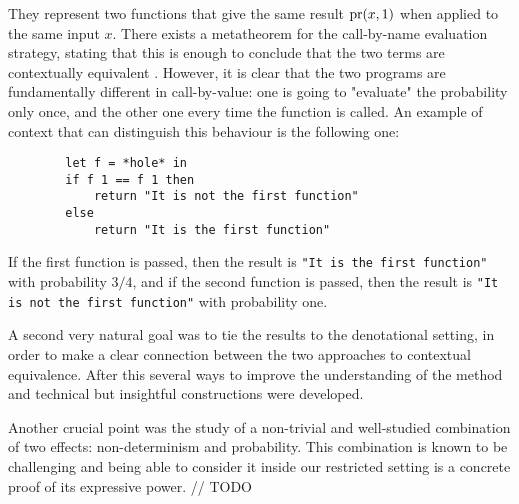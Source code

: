 They represent 
two functions that give the same result $\operatorname{pr} (x, 1)$ when 
applied to the same input $x$. There exists a metatheorem 
for the call-by-name evaluation strategy, stating that this is 
enough to conclude that the two terms are contextually equivalent
\cite{gom}. However, it is clear that the two programs are fundamentally 
different in call-by-value: one is going to "evaluate" the probability 
only once, and the other one every time the function is called. An example 
of context that can distinguish this behaviour is the following one:

\begin{verbatim}
        let f = *hole* in
        if f 1 == f 1 then 
            return "It is not the first function"
        else
            return "It is the first function"
\end{verbatim}

If the first function is passed, then the result is \texttt{"It is the first
function"} with probability
$3/4$, and if the second function is passed, then the result is \texttt{"It is
not the first function"} with probability one.

A second very 
natural goal was to tie the results to the denotational 
setting, in order to make a clear connection between 
the two approaches to contextual equivalence.
After this several ways to improve 
the understanding of the method and technical but insightful 
constructions were developed. 

Another crucial point was the study of a non-trivial and 
well-studied combination of two effects: non-determinism and probability.
This combination is known to be challenging \cite{Mislove2000} and
being able to consider it inside our restricted setting is a concrete 
proof of its expressive power. // TODO





